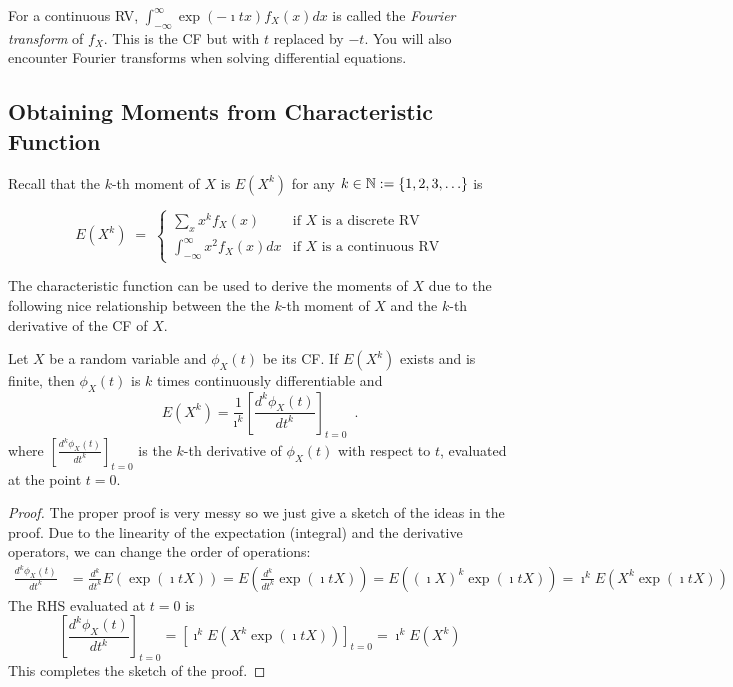For a continuous RV, $\int_{-\infty}^{\infty} \exp \left(- \imath t x\right) f_X(x) dx$ is called the {\em Fourier transform} of $f_X$.  
This is the CF but with $t$ replaced by $-t$.  
You will also encounter Fourier transforms when solving differential equations.


\subsection{Obtaining Moments from Characteristic Function}

Recall that the $k$-th moment of $X$ is $E(X^k)$ for any $k \in \mathbb{N}:=\{1,2,3,\ldots\}$ is
\begin{framed}
\[
E(X^k)\; =\;
\begin{cases}
\displaystyle \sum_x x^k f_X(x) & \text{if $X$ is a discrete RV}\\[12pt]
\displaystyle \int_{-\infty}^{\infty} x^2 f_X(x) dx & \text{if $X$ is a continuous RV}
\end{cases}
\]
\end{framed}

The characteristic function can be used to derive the moments of $X$ due to the following nice relationship between the the $k$-th moment of $X$ and the $k$-th derivative of the CF of $X$.

\begin{framed}
\begin{prop}[Moment \& CF.]
Let $X$ be a random variable and $\phi_X(t)$ be its CF.  
If $E(X^k)$ exists and is finite, then $\phi_X(t)$ is $k$ times continuously differentiable and
\begin{equation*}
E(X^k) = \frac{1}{\imath^k} \left[\frac{d^k \phi_X(t)}{dt^k}\right]_{t=0} \enspace .
\end{equation*}
where $\left[\frac{d^k \phi_X(t)}{dt^k}\right]_{t=0}$ is the $k$-th derivative of $\phi_X(t)$ with respect to $t$, evaluated at the point $t=0$.
\end{prop}
\end{framed}

\begin{proof}
The proper proof is very messy so we just give a sketch of the ideas in the proof.  
Due to the linearity of the expectation (integral) and the derivative operators, we can change the order of operations:
\begin{align*}
\frac{d^k \phi_X(t)}{dt^k}
&= \frac{d^k}{dt^k} E(\exp(\imath t X))
= E \left( \frac{d^k}{dt^k} \exp(\imath t X) \right)
= E \left( (\imath X)^k \exp(\imath t X) \right)
= \imath^k E \left( X^k \exp(\imath t X) \right)
\end{align*}
The RHS evaluated at $t=0$ is
\[
\left[ \frac{d^k \phi_X(t)}{dt^k} \right]_{t=0}
= \left[ \imath^k E \left( X^k \exp(\imath t X) \right) \right]_{t=0} 
= \imath^k E \left( X^k \right)
\]
This completes the sketch of the proof.
\end{proof}

